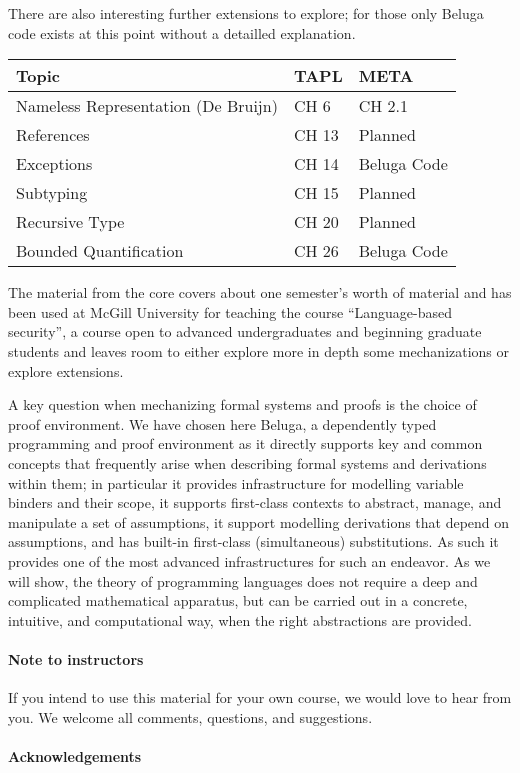 There are also interesting further extensions to explore; for those only Beluga code exists at this point without a detailled explanation. 

\begin{center}
\begin{tabular}{p{9cm}|p{2.5cm}|p{3cm}}
 Topic & TAPL & META \\
\hline    
Nameless Representation (De Bruijn) & CH 6 & CH 2.1 \\  
References & CH 13 & Planned \\
Exceptions & CH 14 & Beluga Code \\
Subtyping & CH 15 & Planned \\
Recursive Type & CH 20 & Planned\\
Bounded Quantification & CH 26 & Beluga Code \\
\end{tabular}
\end{center}


The material from the core covers about one semester's worth of material and has been used at McGill University for teaching the course ``Language-based security'', a course open to advanced undergraduates and beginning graduate students and leaves room to either explore more in depth some mechanizations or explore extensions.

A key question when mechanizing formal systems and proofs is the choice of proof environment.  We have chosen here Beluga, a dependently typed programming and proof environment as it directly supports key and common concepts that frequently arise when describing formal systems and derivations within them; in particular it provides infrastructure for modelling variable binders and their scope, it supports first-class contexts to abstract, manage, and manipulate a set of assumptions, it support modelling derivations that depend on assumptions, and has built-in first-class (simultaneous) substitutions.  As such it provides one of the most advanced infrastructures for such an endeavor. As we will show,  the theory of programming languages does
not require a deep and complicated mathematical apparatus, but can be carried out in a concrete, intuitive, and computational way, when the right abstractions are provided. 



\paragraph{Note to instructors}
If you intend to use this material for your own course, we would love to hear from you. We welcome all comments, questions, and suggestions.

\paragraph{Acknowledgements}

